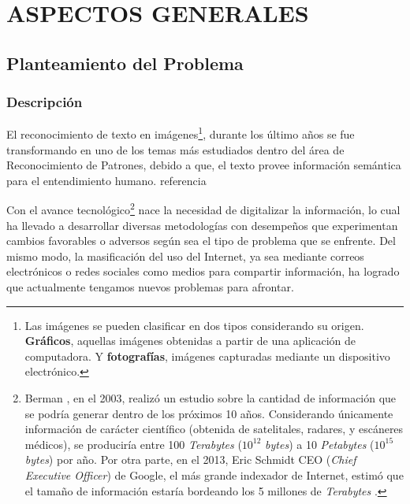\chapter{ASPECTOS GENERALES}
\label{cap:aspectosGenerales}
\setcounter{secnumdepth}{0}

\setcounter{secnumdepth}{3}
\section{Planteamiento del Problema}
\subsection{Descripción}

El reconocimiento de texto en imágenes\footnote{Las imágenes se pueden
clasificar en dos tipos considerando su origen. \textbf{Gráficos}, aquellas
imágenes obtenidas a partir de una aplicación de computadora. Y 
\textbf{fotografías}, imágenes capturadas mediante un dispositivo electrónico.},
durante los último años se fue transformando en uno de los temas más estudiados
dentro del área de Reconocimiento de Patrones, debido a que, el texto provee
información semántica para el entendimiento humano. {\color{red} referencia}

Con el avance tecnológico\footnote{Berman \citep{Berman:2003:GCM}, en el 2003,
realizó un estudio sobre la cantidad de información que se podría generar dentro
de los próximos 10 años. Considerando únicamente información de carácter
científico (obtenida de satelitales, radares, y escáneres médicos), se
produciría entre 100 \textit{Terabytes} ($10^{12}$ \textit{bytes}) a 10
\textit{Petabytes} ($10^{15}$ \textit{bytes}) por año. Por otra parte, en el
2013, Eric Schmidt CEO (\textit{Chief Executive Officer}) de Google, el más
grande indexador de Internet, estimó que el tamaño de información estaría
bordeando los 5 millones de \textit{Terabytes} \citep{McGuigan:2013:HBI}.} nace
la necesidad de digitalizar la información, lo cual ha llevado a desarrollar
diversas metodologías con desempeños que experimentan cambios favorables o
adversos según sea el tipo de problema que se enfrente. Del mismo modo, la
masificación del uso del Internet, ya sea mediante correos electrónicos o redes
sociales como medios para compartir información, ha logrado que actualmente
tengamos nuevos problemas para afrontar.


